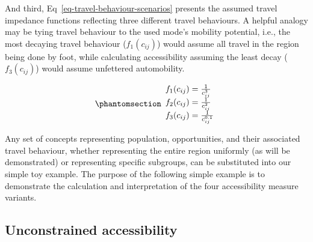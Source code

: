 \documentclass[
  10pt,
  letterpaper,
]{article}
\begin{document}
\begin{table}

\caption{\label{tbl-small-system-cost}Cost matrix for system with three
zones (travel time in minutes).}


\end{table}%

And third, Eq~\ref{eq-travel-behaviour-scenarios} presents the assumed
travel impedance functions reflecting three different travel behaviours.
A helpful analogy may be tying travel behaviour to the used mode's
mobility potential, i.e., the most decaying travel behaviour
(\(f_1(c_{ij})\)) would assume all travel in the region being done by
foot, while calculating accessibility assuming the least decay
(\(f_3(c_{ij})\)) would assume unfettered automobility.

\begin{equation}\phantomsection\label{eq-travel-behaviour-scenarios}{
\begin{array}{l}
f_1(c_{ij}) = \frac{1}{c_{ij}^3}\\
f_2(c_{ij}) = \frac{1}{c_{ij}^2}\\
f_3(c_{ij}) = \frac{1}{c_{ij}^{0.1}}
\end{array}
}\end{equation}

Any set of concepts representing population, opportunities, and their
associated travel behaviour, whether representing the entire region
uniformly (as will be demonstrated) or representing specific subgroups,
can be substituted into our simple toy example. The purpose of the
following simple example is to demonstrate the calculation and
interpretation of the four accessibility measure variants.

\subsection{Unconstrained
accessibility}\label{unconstrained-accessibility}
\end{document}
